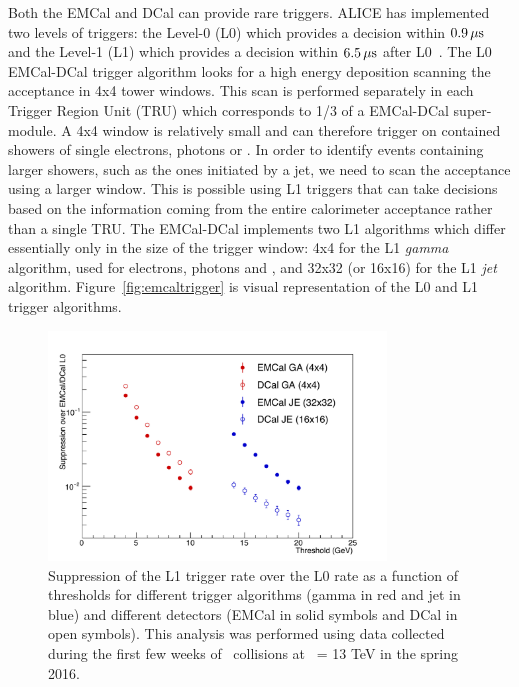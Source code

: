 \documentclass[12pt, a4paper, twoside, titlepage]{article}
\begin{document}
Both the EMCal and DCal can provide rare triggers. ALICE has implemented two levels of triggers: the Level-0 (L0) which provides a decision within 
$0.9\,\rm \mu s$ and the Level-1 (L1) which provides a decision within $6.5\,\rm \mu s$ after L0~\cite{ALICE:2014b}. The L0 EMCal-DCal trigger algorithm looks for a high energy
deposition scanning the acceptance in 4x4 tower windows. This scan is performed separately in each Trigger Region Unit (TRU) which corresponds to 1/3 of a EMCal-DCal super-module.
A 4x4 window is relatively small and can therefore trigger on contained showers of single electrons, photons or \pizero.
In order to identify events containing larger showers, such as the ones initiated by a jet, we need to scan the acceptance using a larger window. This is possible using
L1 triggers that can take decisions based on the information coming from the entire calorimeter acceptance rather than a single TRU. The EMCal-DCal implements two L1 algorithms
which differ essentially only in the size of the trigger window: 4x4 for the L1 \emph{gamma} algorithm, used for electrons, photons and \pizero, and 32x32 (or 16x16) for the L1 \emph{jet} algorithm.
Figure~\ref{fig:emcaltrigger} is visual representation of the L0 and L1 trigger algorithms.

\begin{figure}[tb]
\begin{center}
\includegraphics[width=0.8\textwidth]{img/EMCalTriggerSuppression}
 \caption{Suppression of the L1 trigger rate over the L0 rate as a function of thresholds for different trigger algorithms (gamma in red and jet in blue) 
 and different detectors (EMCal in solid symbols and DCal in open symbols). This analysis was performed using data collected during the first few weeks of
 \pp\ collisions at \s\ = 13 TeV in the spring 2016.} 
 \label{fig:EMCalTriggerSuppression}
\end{center}
\end{figure}
\end{document}
